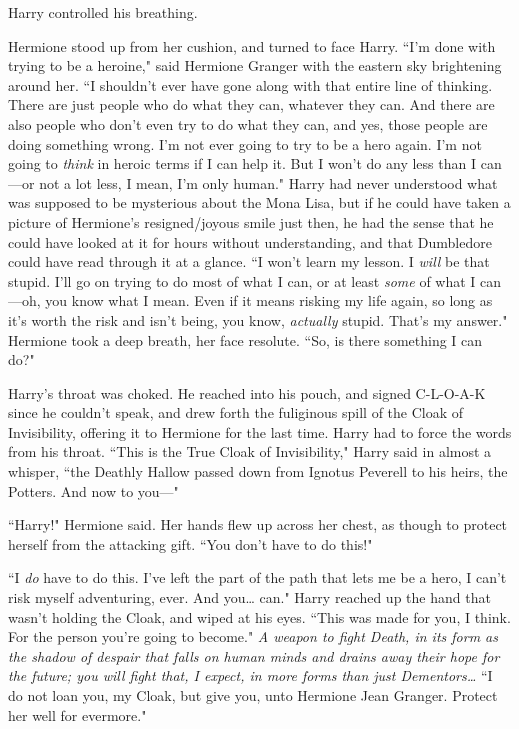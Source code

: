 Harry controlled his breathing.

Hermione stood up from her cushion, and turned to face Harry. ``I'm done with trying to be a heroine," said Hermione Granger with the eastern sky brightening around her. ``I shouldn't ever have gone along with that entire line of thinking. There are just people who do what they can, whatever they can. And there are also people who don't even try to do what they can, and yes, those people are doing something wrong. I'm not ever going to try to be a hero again. I'm not going to \emph{think} in heroic terms if I can help it. But I won't do any less than I can—or not a lot less, I mean, I'm only human." Harry had never understood what was supposed to be mysterious about the Mona Lisa, but if he could have taken a picture of Hermione's resigned/joyous smile just then, he had the sense that he could have looked at it for hours without understanding, and that Dumbledore could have read through it at a glance. ``I won't learn my lesson. I \emph{will} be that stupid. I'll go on trying to do most of what I can, or at least \emph{some} of what I can—oh, you know what I mean. Even if it means risking my life again, so long as it's worth the risk and isn't being, you know, \emph{actually} stupid. That's my answer." Hermione took a deep breath, her face resolute. ``So, is there something I can do?"

Harry's throat was choked. He reached into his pouch, and signed C-L-O-A-K since he couldn't speak, and drew forth the fuliginous spill of the Cloak of Invisibility, offering it to Hermione for the last time. Harry had to force the words from his throat. ``This is the True Cloak of Invisibility," Harry said in almost a whisper, ``the Deathly Hallow passed down from Ignotus Peverell to his heirs, the Potters. And now to you—"

``Harry!" Hermione said. Her hands flew up across her chest, as though to protect herself from the attacking gift. ``You don't have to do this!"

``I \emph{do} have to do this. I've left the part of the path that lets me be a hero, I can't risk myself adventuring, ever. And you{\ldots} can." Harry reached up the hand that wasn't holding the Cloak, and wiped at his eyes. ``This was made for you, I think. For the person you're going to become." \emph{A weapon to fight Death, in its form as the shadow of despair that falls on human minds and drains away their hope for the future; you will fight that, I expect, in more forms than just Dementors{\ldots}} ``I do not loan you, my Cloak, but give you, unto Hermione Jean Granger. Protect her well for evermore."

